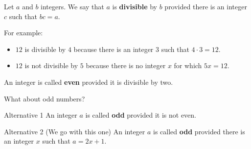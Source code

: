 \documentclass{beamer}
\begin{document}
\begin{frame}[t]

\begin{definition}
Let $a$ and $b$ integers. We say that $a$ is \textbf{divisible} by $b$ provided there is an integer $c$ such that $bc=a$. 
\end{definition}

For example:
\begin{itemize}
\item<3->$12$ is divisible by $4$ because there is an integer $3$ such that $4\cdot 3=12$.
\item<5-> $12$ is not divisible by $5$ because there is no integer $x$ for which $5x=12$.
\end{itemize}
\end{frame}

\begin{frame}
\begin{definition}
An integer is called \textbf{even} provided it is divisible by two.
\end{definition}

What about odd numbers?

\begin{block}{Alternative 1}
An integer $a$ is called \textbf{odd} provided it is not even.
\end{block}

\begin{block}{Alternative 2 (We go with this one)}
An integer $a$ is called \textbf{odd} provided there is an integer $x$ such that $a=2x+1$.
\end{block}

\end{frame}
\end{document}
